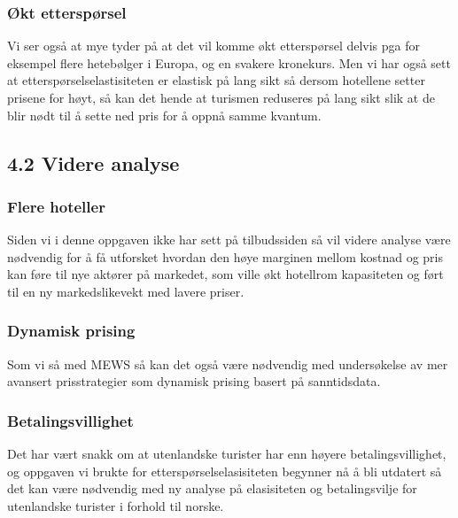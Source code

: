 \documentclass[
  12pt,
  a4paper,
  DIV=11,
  numbers=noendperiod]{scrartcl}
\begin{document}
\subsubsection{Økt etterspørsel}\label{uxf8kt-etterspuxf8rsel}

Vi ser også at mye tyder på at det vil komme økt etterspørsel delvis pga
for eksempel flere hetebølger i Europa, og en svakere kronekurs. Men vi
har også sett at etterspørselselastisiteten er elastisk på lang sikt så
dersom hotellene setter prisene for høyt, så kan det hende at turismen
reduseres på lang sikt slik at de blir nødt til å sette ned pris for å
oppnå samme kvantum.

\subsection{4.2 Videre analyse}\label{videre-analyse}

\subsubsection{Flere hoteller}\label{flere-hoteller}

Siden vi i denne oppgaven ikke har sett på tilbudssiden så vil videre
analyse være nødvendig for å få utforsket hvordan den høye marginen
mellom kostnad og pris kan føre til nye aktører på markedet, som ville
økt hotellrom kapasiteten og ført til en ny markedslikevekt med lavere
priser.

\subsubsection{Dynamisk prising}\label{dynamisk-prising}

Som vi så med MEWS så kan det også være nødvendig med undersøkelse av
mer avansert prisstrategier som dynamisk prising basert på sanntidsdata.

\subsubsection{Betalingsvillighet}\label{betalingsvillighet}

Det har vært snakk om at utenlandske turister har enn høyere
betalingsvillighet, og oppgaven vi brukte for etterspørselselasisiteten
begynner nå å bli utdatert så det kan være nødvendig med ny analyse på
elasisiteten og betalingsvilje for utenlandske turister i forhold til
norske.

\clearpage
\end{document}
